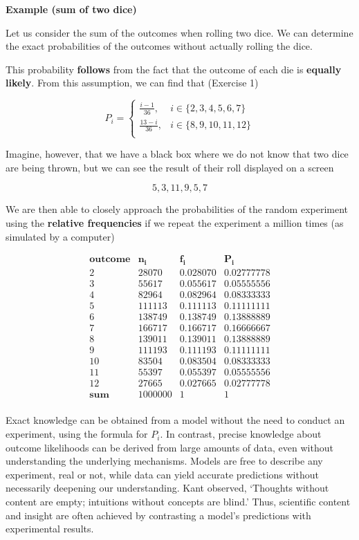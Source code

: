 \documentclass[
]{book}
\begin{document}
\textbf{Example (sum of two dice)}

Let us consider the sum of the outcomes when rolling two dice. We can determine the exact probabilities of the outcomes without actually rolling the dice.

This probability \textbf{follows} from the fact that the outcome of each die is \textbf{equally likely}. From this assumption, we can find that (Exercise 1)

\[
    P_i =
\begin{cases}
\frac{i-1}{36},& i \in \{2,3,4,5,6, 7\} \\
\frac{13-i}{36},& i \in \{8,9,10,11,12\} \\
\end{cases}
\]

Imagine, however, that we have a black box where we do not know that two dice are being thrown, but we can see the result of their roll displayed on a screen

\[5, 3, 11, 9, 5, 7\]

We are then able to closely approach the probabilities of the random experiment using the \textbf{relative frequencies} if we repeat the experiment a million times (as simulated by a computer)

\[
\begin{array}{cccc}
\mathbf{outcome}   & \mathbf{n_i} & \mathbf{f_i} & \mathbf{P_i} \\
2  & 28070  & 0.028070  & 0.02777778 \\
3  & 55617  & 0.055617  & 0.05555556 \\
4  & 82964  & 0.082964  & 0.08333333 \\
5  & 111113 & 0.111113  & 0.11111111 \\
6  & 138749 & 0.138749  & 0.13888889 \\
7  & 166717 & 0.166717  & 0.16666667 \\
8  & 139011 & 0.139011  & 0.13888889 \\
9  & 111193 & 0.111193  & 0.11111111 \\
10 & 83504  & 0.083504  & 0.08333333 \\
11 & 55397  & 0.055397  & 0.05555556 \\
12 & 27665  & 0.027665  & 0.02777778 \\ \hline
\mathbf{sum} & 1000000 & 1 & 1 \\ 
\end{array}
\]

Exact knowledge can be obtained from a model without the need to conduct an experiment, using the formula for \(P_i\). In contrast, precise knowledge about outcome likelihoods can be derived from large amounts of data, even without understanding the underlying mechanisms. Models are free to describe any experiment, real or not, while data can yield accurate predictions without necessarily deepening our understanding. Kant observed, `Thoughts without content are empty; intuitions without concepts are blind.' Thus, scientific content and insight are often achieved by contrasting a model's predictions with experimental results.
\end{document}
